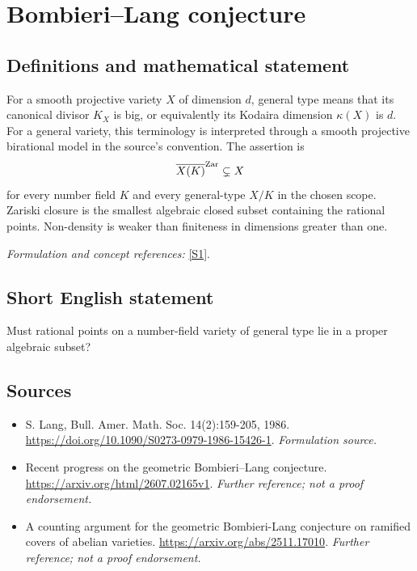 \documentclass[11pt]{article}
\begin{document}
\section*{\texorpdfstring{Bombieri–Lang conjecture}{Bombieri–Lang conjecture}}\label{statement}
\subsection{Definitions and mathematical statement}
For a smooth projective variety $X$ of dimension $d$, general type means that its canonical divisor $K_X$ is big, or equivalently its Kodaira dimension $\kappa(X)$ is $d$. For a general variety, this terminology is interpreted through a smooth projective birational model in the source's convention. The assertion is
\[
 \overline{X(K)}^{\rm Zar}\subsetneq X
\]
for every number field $K$ and every general-type $X/K$ in the chosen scope. Zariski closure is the smallest algebraic closed subset containing the rational points. Non-density is weaker than finiteness in dimensions greater than one.
\par\smallskip\textit{Formulation and concept references:} \href{https://doi.org/10.1090/S0273-0979-1986-15426-1}{[S1]}.

\subsection{Short English statement}
Must rational points on a number-field variety of general type lie in a proper algebraic subset?
\subsection{Sources}
\begin{itemize}
\item[S1]S. Lang, Bull. Amer. Math. Soc. 14(2):159-205, 1986.
\url{https://doi.org/10.1090/S0273-0979-1986-15426-1}.
\textit{Formulation source.}
\item[S2]Recent progress on the geometric Bombieri–Lang conjecture.
\url{https://arxiv.org/html/2607.02165v1}.
\textit{Further reference; not a proof endorsement.}
\item[S3]A counting argument for the geometric Bombieri-Lang conjecture on ramified covers of abelian varieties.
\url{https://arxiv.org/abs/2511.17010}.
\textit{Further reference; not a proof endorsement.}
\end{itemize}
\end{document}
